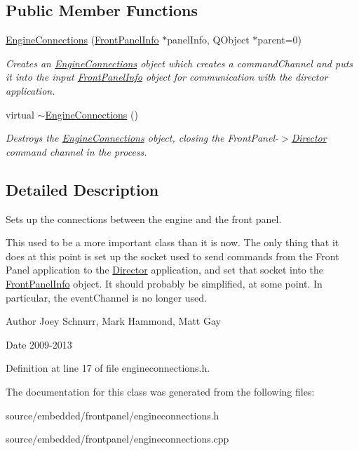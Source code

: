 \subsection*{Public Member Functions}
\begin{DoxyCompactItemize}
\item 
\hypertarget{class_engine_connections_acb38eac1a3302c4668d2f2b0be48788c}{\hyperlink{class_engine_connections_acb38eac1a3302c4668d2f2b0be48788c}{Engine\-Connections} (\hyperlink{class_front_panel_info}{Front\-Panel\-Info} $\ast$panel\-Info, Q\-Object $\ast$parent=0)}\label{class_engine_connections_acb38eac1a3302c4668d2f2b0be48788c}

\begin{DoxyCompactList}\small\item\em Creates an \hyperlink{class_engine_connections}{Engine\-Connections} object which creates a command\-Channel and puts it into the input \hyperlink{class_front_panel_info}{Front\-Panel\-Info} object for communication with the director application. \end{DoxyCompactList}\item 
\hypertarget{class_engine_connections_a7d06ed516638c57ae407581ebe53781b}{virtual \hyperlink{class_engine_connections_a7d06ed516638c57ae407581ebe53781b}{$\sim$\-Engine\-Connections} ()}\label{class_engine_connections_a7d06ed516638c57ae407581ebe53781b}

\begin{DoxyCompactList}\small\item\em Destroys the \hyperlink{class_engine_connections}{Engine\-Connections} object, closing the Front\-Panel-\/$>$\hyperlink{class_director}{Director} command channel in the process. \end{DoxyCompactList}\end{DoxyCompactItemize}


\subsection{Detailed Description}
Sets up the connections between the engine and the front panel. 

This used to be a more important class than it is now. The only thing that it does at this point is set up the socket used to send commands from the Front Panel application to the \hyperlink{class_director}{Director} application, and set that socket into the \hyperlink{class_front_panel_info}{Front\-Panel\-Info} object. It should probably be simplified, at some point. In particular, the event\-Channel is no longer used. \begin{DoxyAuthor}{Author}
Joey Schnurr, Mark Hammond, Matt Gay 
\end{DoxyAuthor}
\begin{DoxyDate}{Date}
2009-\/2013 
\end{DoxyDate}


Definition at line 17 of file engineconnections.\-h.



The documentation for this class was generated from the following files\-:\begin{DoxyCompactItemize}
\item 
source/embedded/frontpanel/engineconnections.\-h\item 
source/embedded/frontpanel/engineconnections.\-cpp\end{DoxyCompactItemize}
